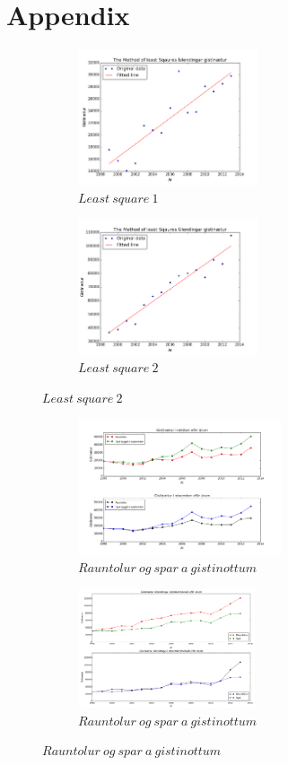 \documentclass[11pt,a4paper]{amsart}
\theoremstyle{plain}
\theoremstyle{definition}
\theoremstyle{remark}
\begin{document}
\section{Appendix}

\begin{figure}[H]
	\centering
	\begin{subfigure}[b]{0.4\textwidth}
		\includegraphics[height=40mm]{mynd2.png}
		\caption{$ Least\ square\ 1$\label{fig:mynd2}}
	\end{subfigure}
	\begin{subfigure}[b]{0.4\textwidth}
		\includegraphics[height=40mm]{mynd3.png}
		\caption{$ Least\ square\ 2 $\label{fig:mynd3}}	
	\end{subfigure}
\end{figure}

\begin{figure}[H]
	\centering
	\begin{subfigure}[b]{0.45\textwidth}
		\includegraphics[height=40mm]{mynd4.png}
		\caption{$ Rauntolur\ og\ spar\ a\ gistinottum $\label{fig:mynd4}}
	\end{subfigure}
	\begin{subfigure}[b]{0.45\textwidth}
		\includegraphics[height=35mm]{graf_2.png}
		\caption{$ Rauntolur\ og\ spar\ a\ gistinottum $\label{fig:gist_spa}}
	\end{subfigure}
\end{figure}
\end{document}
